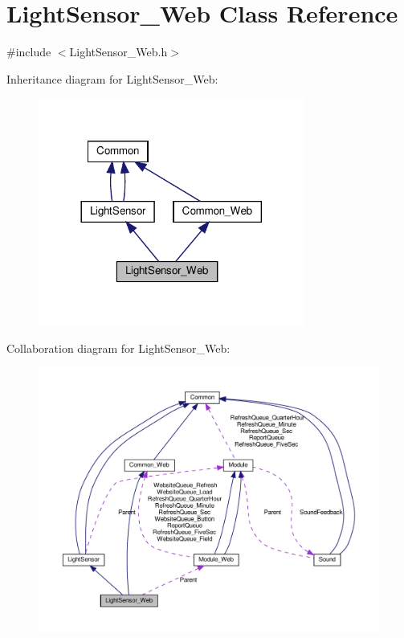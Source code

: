 \hypertarget{class_light_sensor___web}{}\section{Light\+Sensor\+\_\+\+Web Class Reference}
\label{class_light_sensor___web}


{\ttfamily \#include $<$Light\+Sensor\+\_\+\+Web.\+h$>$}



Inheritance diagram for Light\+Sensor\+\_\+\+Web\+:
\nopagebreak
\begin{figure}[H]
\begin{center}
\leavevmode
\includegraphics[width=248pt]{class_light_sensor___web__inherit__graph}
\end{center}
\end{figure}


Collaboration diagram for Light\+Sensor\+\_\+\+Web\+:
\nopagebreak
\begin{figure}[H]
\begin{center}
\leavevmode
\includegraphics[width=350pt]{class_light_sensor___web__coll__graph}
\end{center}
\end{figure}
